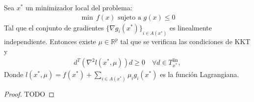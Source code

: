\documentclass{article}
\newcommand{\R}{\mathbb{R}}
\newenvironment{theorem}[2][Ejercicio]{\begin{trivlist}
\item[\hskip \labelsep {\bfseries #1}\hskip \labelsep {\bfseries #2.}]}{\end{trivlist}}
\begin{document}
\begin{theorem}{13}
    Sea \( x^* \) un minimizador local del problema: \begin{align*}
        \min \, f(x) \text{ sujeto a } g(x) \leq 0
    \end{align*}
    Tal que el conjunto de gradientes \( {\{ \nabla g_i(x^*) \}}_{i \in A(x^*)} \) es linealmente independiente. Entonces existe \( \mu \in \R^p \) tal que se verifican las condiciones de KKT y \begin{align*}
        d^T \left( \nabla^2 l(x^*, \mu) \right) d \geq 0 \quad \forall d \in T^{\text{lin}}_{x^*},
    \end{align*}
    Donde \( l(x^*, \mu) = f(x^*) + \sum_{i \in A(x^*)} \mu_i g_i(x^*) \) es la función Lagrangiana.
\end{theorem}

\begin{proof}
    TODO
\end{proof}
\end{document}
